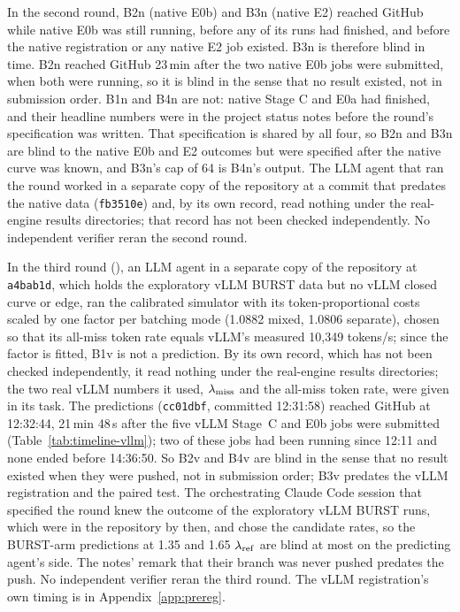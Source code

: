 In the second round, B2n (native E0b) and B3n (native E2) reached GitHub while native E0b was still running, before any of its runs had finished, and before the native registration or any native E2 job existed. B3n is therefore blind in time. B2n reached GitHub 23\,min after the two native E0b jobs were submitted, when both were running, so it is blind in the sense that no result existed, not in submission order. B1n and B4n are not: native Stage C and E0a had finished, and their headline numbers were in the project status notes before the round's specification was written. That specification is shared by all four, so B2n and B3n are blind to the native E0b and E2 outcomes but were specified after the native curve was known, and B3n's cap of 64 is B4n's output. The LLM agent that ran the round worked in a separate copy of the repository at a commit that predates the native data (\texttt{fb3510e}) and, by its own record, read nothing under the real-engine results directories; that record has not been checked independently. No independent verifier reran the second round.

In the third round (), an LLM agent in a separate copy of the repository at \texttt{a4bab1d}, which holds the exploratory vLLM BURST data but no vLLM closed curve or edge, ran the calibrated simulator with its token-proportional costs scaled by one factor per batching mode (1.0882 mixed, 1.0806 separate), chosen so that its all-miss token rate equals vLLM's measured 10,349 tokens/s; since the factor is fitted, B1v is not a prediction. By its own record, which has not been checked independently, it read nothing under the real-engine results directories; the two real vLLM numbers it used, $\lambda_{\mathrm{miss}}$ and the all-miss token rate, were given in its task. The predictions (\texttt{cc01dbf}, committed 12:31:58) reached GitHub at 12:32:44, 21\,min 48\,s after the five vLLM Stage~C and E0b jobs were submitted (Table~\ref{tab:timeline-vllm}); two of these jobs had been running since 12:11 and none ended before 14:36:50. So B2v and B4v are blind in the sense that no result existed when they were pushed, not in submission order; B3v predates the vLLM registration and the paired test. The orchestrating Claude Code session that specified the round knew the outcome of the exploratory vLLM BURST runs, which were in the repository by then, and chose the candidate rates, so the BURST-arm predictions at 1.35 and 1.65 $\lambda_{\mathrm{ref}}$ are blind at most on the predicting agent's side. The notes' remark that their branch was never pushed predates the push. No independent verifier reran the third round. The vLLM registration's own timing is in Appendix~\ref{app:prereg}.

